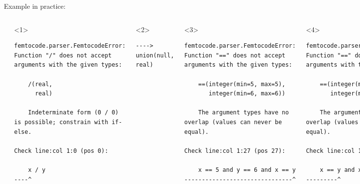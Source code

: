 \documentclass[aspectratio=169]{beamer}
\begin{document}
\begin{frame}[fragile]{Example in practice: }
\begin{columns}
\begin{center}
\end{center}

\begin{onlyenv}<1>
\begin{verbatim}
femtocode.parser.FemtocodeError: Function "/" does not accept
arguments with the given types:

    /(real,
      real)

    Indeterminate form (0 / 0) is possible; constrain with if-else.

Check line:col 1:0 (pos 0):

    x / y
----^
\end{verbatim}
\end{onlyenv}
\begin{onlyenv}<2>
\begin{verbatim}
----> union(null, real)











\end{verbatim}
\end{onlyenv}
\begin{onlyenv}<3>
\begin{verbatim}
femtocode.parser.FemtocodeError: Function "==" does not accept
arguments with the given types:

    ==(integer(min=5, max=5),
       integer(min=6, max=6))

    The argument types have no overlap (values can never be equal).

Check line:col 1:27 (pos 27):

    x == 5 and y == 6 and x == y
-------------------------------^
\end{verbatim}
\end{onlyenv}
\begin{onlyenv}<4>
\begin{verbatim}
femtocode.parser.FemtocodeError: Function "==" does not accept
arguments with the given types:

    ==(integer(min=5, max=5),
       integer(min=6, max=6))

    The argument types have no overlap (values can never be equal).

Check line:col 1:5 (pos 5):

    x == y and x == 5 and y == 6
---------^
\end{verbatim}
\end{onlyenv}
\end{columns}
\end{frame}
\end{document}
